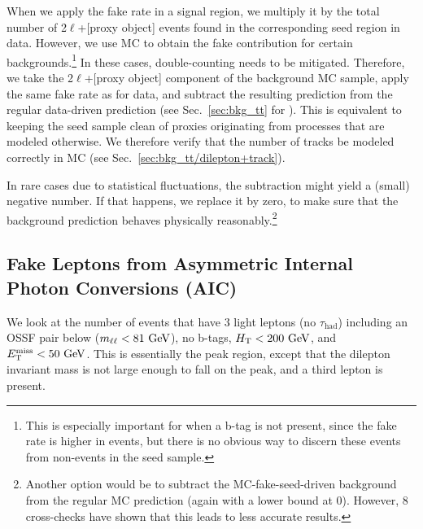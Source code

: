 When we apply the fake rate in a signal region, we multiply it by the total number of 2$\ell$+[proxy object] events found in the corresponding seed region in data. However, we use MC to obtain the fake contribution for certain backgrounds.\footnote{This is especially important for \ttbar when a b-tag is not present, since the fake rate is higher in \ttbar events, but there is no obvious way to discern these events from non-\ttbar events in the seed sample.} In these cases, double-counting needs to be mitigated. Therefore, we take the 2$\ell$+[proxy object] component of the background MC sample, apply the same fake rate as for data, and subtract the resulting prediction from the regular data-driven prediction (see \eg Sec.~\ref{sec:bkg_tt} for \ttbar). This is equivalent to keeping the seed sample clean of proxies originating from processes that are modeled otherwise. We therefore verify that the number of tracks be modeled correctly in MC (see Sec.~\ref{sec:bkg_tt/dilepton+track}).

In rare cases due to statistical fluctuations, the subtraction might yield a (small) negative number. If that happens, we replace it by zero, to make sure that the background prediction behaves physically reasonably.\footnote{Another option would be to subtract the MC-fake-seed-driven background from the regular \ttbar MC prediction (again with a lower bound at 0). However, 8\,\TeV cross-checks have shown that this leads to less accurate results.}


\subsection{Fake Leptons from Asymmetric Internal Photon Conversions (AIC)}
\label{sec:bkg_fakeLight/photons}
We look at the number of events that have 3 light leptons (no $\tau_\textrm{had}$) including an OSSF pair below \Z (\ie $m_{\ell\ell} < 81\,\,\text{Ge\hspace{-.08em}V}$), no b-tags, $H_{\mathrm{T}} < 200\,\,\text{Ge\hspace{-.08em}V}$, and $E_{\mathrm{T}}^{\text{miss}} < 50\,\,\text{Ge\hspace{-.08em}V}$. This is essentially the \Z peak region, except that the dilepton invariant mass is not large enough to fall on the \Z peak, and a third lepton is present.

